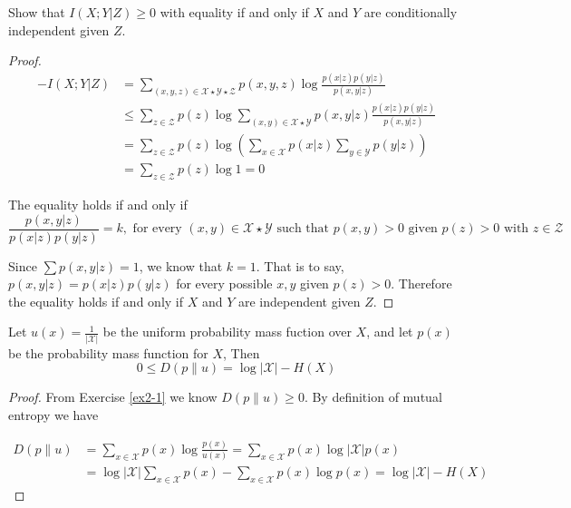 \begin{exercise} {Show that $I(X;Y|Z)\ge 0$ with equality if and only if $X$ and $Y$ are conditionally independent given $Z$.}
\begin{proof}
\begin{equation}
  \begin{aligned}
    -I(X;Y|Z) &= \sum_{(x,y,z)\in \mathcal{X}\star \mathcal{Y} \star \mathcal{Z}} p(x,y,z) \log {\frac{p(x|z)p(y|z)}{p(x,y|z)}} \\
    &\le \sum_{z\in \mathcal{Z}} p(z) \log \sum_{(x,y)\in \mathcal{X} \star \mathcal{Y} } p(x,y|z) \frac{p(x|z)p(y|z)}{p(x,y|z)} \\
    &= \sum_{z\in \mathcal{Z}} p(z)  \log \left(\sum_{x\in \mathcal{X}}p(x|z) \sum_{y \in \mathcal{Y}} p(y|z) \right) \\
    &= \sum_{z\in \mathcal{Z}} p(z) \log 1 = 0
  \end{aligned}
\end{equation}

The equality holds if and only if $$\frac{p(x,y|z)}{p(x|z)p(y|z)}=k, \text{ for every } (x,y) \in \mathcal{X} \star \mathcal{Y} \text{ such that } p(x,y)>0 \text{ given } p(z)>0 \text{ with } z\in \mathcal{Z}$$

Since $\sum p(x,y|z) = 1$, we know that $k=1$. That is to say, $p(x,y|z) = p(x|z)p(y|z)$ for every possible $x,y$ given $p(z)>0$. Therefore the equality holds if and only if $X$ and $Y$ are independent given $Z$.

\end{proof}
\end{exercise}


\begin{exercise} {Let $u(x)=\frac{1}{|\mathcal{X}|}$ be the uniform probability mass fuction over $X$, and let $p(x)$ be the probability mass function for $X$, Then
  $$0\le D(p\| u)= \log |\mathcal{X}|-H(X)$$}
\begin{proof}
  
  From Exercise \ref{ex2-1} we know $D(p\| u)\ge 0$. By definition of mutual entropy we have

  \begin{equation}
    \begin{aligned}
      D(p\| u) &= \sum_{x\in \mathcal{X}}p(x) \log{\frac{p(x)}{u(x)}} = \sum_{x\in \mathcal{X}}p(x) \log{|\mathcal{X}|p(x)} \\
      &= \log{|\mathcal{X}|}\sum_{x\in \mathcal{X}}p(x) - \sum_{x\in \mathcal{X}} p(x) \log p(x) =  \log |\mathcal{X}|-H(X)
    \end{aligned}
  \end{equation}
\end{proof}
\end{exercise}

